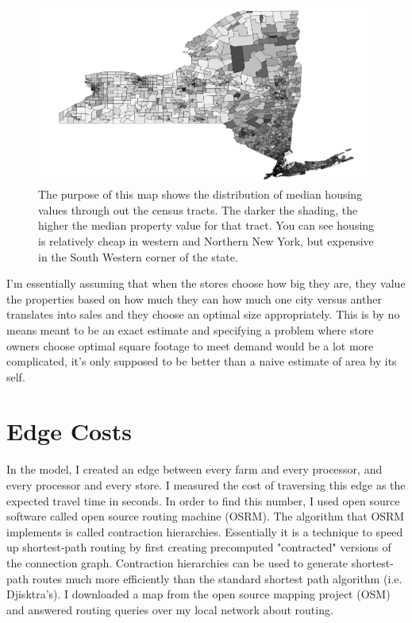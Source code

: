 \documentclass{report}
\begin{document}
\begin{figure}
\centering
\begin{framed}
\includegraphics[scale=.39]{map_4}
\caption{The purpose of this map shows the distribution of median housing values through out the census tracts. The darker the shading, the higher the median property value for that tract. You can see housing is relatively cheap in western and Northern New York, but expensive in the South Western corner of the state.}
\label{fig:map_4}
\end{framed}
\end{figure}

I'm essentially assuming that when the stores choose how big they are, they value the properties based on how much they can how much one city versus anther translates into sales and they choose an optimal size appropriately. This is by no means meant to be an exact estimate and specifying a problem where store owners choose optimal square footage to meet demand would be a lot more complicated, it's only supposed to be better than a naive estimate of area by its self.

\section{Edge Costs}

In the model, I created an edge between every farm and every processor, and every processor and every store. I measured the cost of traversing this edge as the expected travel time in seconds. In order to find this number, I used open source software called open source routing machine (OSRM). The algorithm that OSRM implements is called contraction hierarchies. Essentially it is a technique to speed up shortest-path routing by first creating precomputed "contracted" versions of the connection graph. Contraction hierarchies can be used to generate shortest-path routes much more efficiently than the standard shortest path algorithm (i.e. Djisktra's). I downloaded a map from the open source mapping project (OSM) and answered routing queries over my local network about routing.
\end{document}
